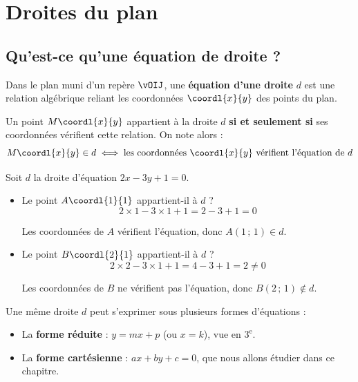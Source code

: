 \chapter{Droites du plan}

\section{Qu'est-ce qu'une équation de droite ?}

\begin{definition}
	Dans le plan muni d'un repère $\vOIJ$, une \textbf{équation d'une droite} $d$ est une relation algébrique reliant les coordonnées $\coordl{x}{y}$ des points du plan.

	Un point $M\coordl{x}{y}$ appartient à la droite $d$ \textbf{si et seulement si} ses coordonnées vérifient cette relation. On note alors :
	\[
		M\coordl{x}{y} \in d \iff \text{les coordonnées }\coordl{x}{y}\text{ vérifient l'équation de }d
	\]
\end{definition}

\begin{ex}
	Soit $d$ la droite d'équation $2x - 3y + 1 = 0$.
	\begin{itemize}
		\item Le point $A\coordl{1}{1}$ appartient-il à $d$ ?
		      \[
			      2 \times 1 - 3 \times 1 + 1 = 2 - 3 + 1 = 0
		      \]

		      Les coordonnées de $A$ vérifient l'équation, donc $A(1\,;\,1) \in d$.

		\item Le point $B\coordl{2}{1}$ appartient-il à $d$ ?
		      \[
			      2 \times 2 - 3 \times 1 + 1 = 4 - 3 + 1 = 2 \neq 0
		      \]

		      Les coordonnées de $B$ ne vérifient pas l'équation, donc $B(2\,;\,1) \notin d$.
	\end{itemize}
\end{ex}

\begin{remarque}
	Une même droite $d$ peut s'exprimer sous plusieurs formes d'équations :

	\begin{itemize}
		\item La \textbf{forme réduite} : $y = mx + p$ (ou $x = k$), vue en $3^\text{e}$.
		\item La \textbf{forme cartésienne} : $ax + by + c = 0$, que nous allons étudier dans ce chapitre.
	\end{itemize}
\end{remarque}

